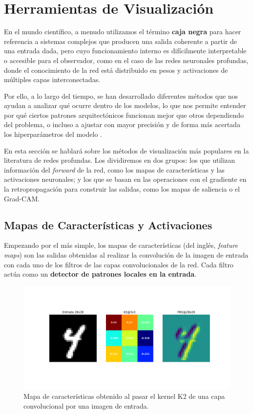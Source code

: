 \chapter{Herramientas de Visualización}\label{cap:herramientas_visualizacion}

En el mundo científico, a menudo utilizamos el término \textbf{caja negra} para hacer referencia a sistemas complejos que producen una salida coherente a partir de una entrada dada, pero cuyo funcionamiento interno es difícilmente interpretable o accesible para el observador, como en el caso de las redes neuronales profundas, donde el conocimiento de la red está distribuido en pesos y activaciones de múltiples capas interconectadas.

Por ello, a lo largo del tiempo, se han desarrollado diferentes métodos que nos ayudan a analizar qué ocurre dentro de los modelos, lo que nos permite entender por qué ciertos patrones arquitectónicos funcionan mejor que otros dependiendo del problema, o incluso a ajustar con mayor precisión y de forma más acertada los hiperparámetros del modelo \cite{dl_python__chollet_2021, dl__goodfellow_2016}.

En esta sección se hablará sobre los métodos de visualización más populares en la literatura de redes profundas. Los dividiremos en dos grupos: los que utilizan información del \textit{forward} de la red, como los mapas de características y las activaciones neuronales; y los que se basan en las operaciones con el gradiente en la retropropagación para construir las salidas, como los mapas de saliencia o el Grad-CAM.

\section{Mapas de Características y Activaciones}

Empezando por el más simple, los mapas de características (del inglés, \textit{feature maps}) son las salidas obtenidas al realizar la convolución de la imagen de entrada con cada uno de los filtros de las capas convolucionales de la red. Cada filtro actúa como un \textbf{detector de patrones locales en la entrada}.

\begin{figure}[htb]
	\centering
	\includegraphics[width=0.7\linewidth]{figures/ejemplos/mapa_caracterisicas_con_kernel.png}
	\caption{Mapa de características obtenido al pasar el kernel K2 de una capa convolucional por una imagen de entrada.}
	\label{fig:mapa_caracterisitcas_kernel_k2}
\end{figure}

